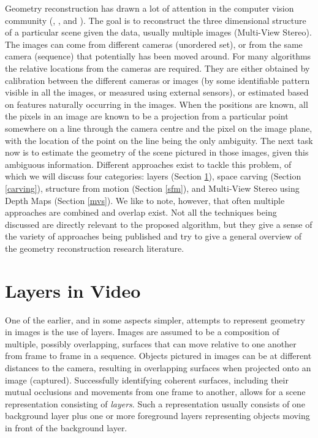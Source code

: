

Geometry reconstruction has drawn a lot of attention in the computer vision community (, , and ). The goal is to reconstruct the three dimensional structure of a particular scene given the data, usually multiple images (Multi-View Stereo). The images can come from different cameras (unordered set), or from the same camera (sequence) that potentially has been moved around. For many algorithms the relative locations from the cameras are required. They are either obtained by calibration between the different cameras or images (\eg by some identifiable pattern visible in all the images, or measured using external sensors), or estimated based on features naturally occurring in the images. When the positions are known, all the pixels in an image are known to be a projection from a particular point somewhere on a line through the camera centre and the pixel on the image plane, with the location of the point on the line being the only ambiguity. The next task now is to estimate the geometry of the scene pictured in those images, given this ambiguous information. Different approaches exist to tackle this problem, of which we will discuss four categories: layers (Section \ref{layers}), space carving (Section \ref{carving}), structure from motion (Section \ref{sfm}), and Multi-View Stereo using Depth Maps (Section \ref{mvs}). We like to note, however, that often multiple approaches are combined and overlap exist. Not all the techniques being discussed are directly relevant to the proposed algorithm, but they give a sense of the variety of approaches being published and try to give a general overview of the geometry reconstruction research literature.


\pagebreak
\section{Layers in Video}  \label{layers}
One of the earlier, and in some aspects simpler, attempts to represent geometry in images is the use of layers. Images are assumed to be a composition of multiple, possibly overlapping, surfaces that can move relative to one another from frame to frame in a sequence. Objects pictured in images can be at different distances to the camera, resulting in overlapping surfaces when projected onto an image (\ie captured). Successfully identifying coherent surfaces, including their mutual occlusions and movements from one frame to another, allows for a scene representation consisting of \emph{layers}. Such a representation usually consists of one background layer plus one or more foreground layers representing objects moving in front of the background layer.

